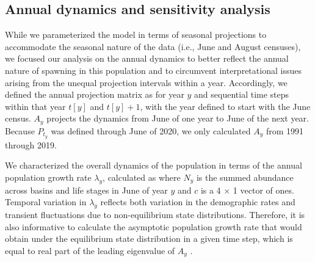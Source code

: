\documentclass[11pt]{article}
\begin{document}

\subsection*{Annual dynamics and sensitivity analysis}


While we parameterized the model in terms of seasonal projections
to accommodate the seasonal nature of the data (i.e., June and August censuses),
we focused our analysis on the annual dynamics to better reflect
the annual nature of spawning in this population
and to circumvent interpretational
issues arising from the unequal projection intervals within a year.
Accordingly, we defined the annual projection matrix as
%
%
for year $y$ and sequential time steps within that year $t[y]$ and $t[y]+1$,
with the year defined to start with the June census.
$A_y$ projects the dynamics from
June of one year to June of the next year.
Because $P_t_y$ was defined through June of 2020,
we only calculated $A_y$ from 1991 through 2019.

We characterized the overall dynamics of the population in terms of the annual
population growth rate $\lambda_y$, calculated as
%
%
where $N_y$ is the summed abundance across basins and life stages in June of year $y$
and $c$ is a 4 $\times$ 1 vector of ones.
Temporal variation in $\lambda_y$ reflects both variation in the demographic rates
and transient fluctuations due to non-equilibrium state distributions.
Therefore, it is also informative to calculate
the asymptotic population growth rate that
would obtain under the equilibrium state distribution in a given time step,
which is equal to real part of the leading eigenvalue of $A_y$
\citep{caswell2001matrix}.
\end{document}
